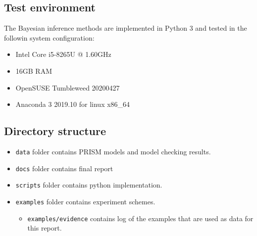 \documentclass[12pt]{article}
\theoremstyle{definition}
\begin{document}
\subsection{Test environment}
The Bayesian inference methods are implemented in Python 3 and tested in the
followin system configuration:
\begin{itemize}
\item Intel Core i5-8265U @ 1.60GHz
\item 16GB RAM
\item OpenSUSE Tumbleweed 20200427
\item Anaconda 3 2019.10 for linux x86\_64
\end{itemize}

\subsection{Directory structure}
\begin{itemize}
\item \texttt{data} folder contains PRISM models and model checking results.
\item \texttt{docs} folder contains final report
\item \texttt{scripts} folder contains python implementation.
\item \texttt{examples} folder contains experiment schemes.
  \begin{itemize}
  \item \texttt{examples/evidence} contains log of the examples that are used as
    data for this report.
  \end{itemize}
\end{itemize}


\end{document}
